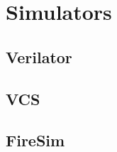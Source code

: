 \chapter{Simulators}\label{chap:Simulators}

\section{Verilator}\label{sec:Verilator_Simulator}

\section{VCS}\label{sec:VCS_Simulator}

\section{FireSim}\label{sec:FireSim_Simulator}
\nocite{firesimPresentation}

